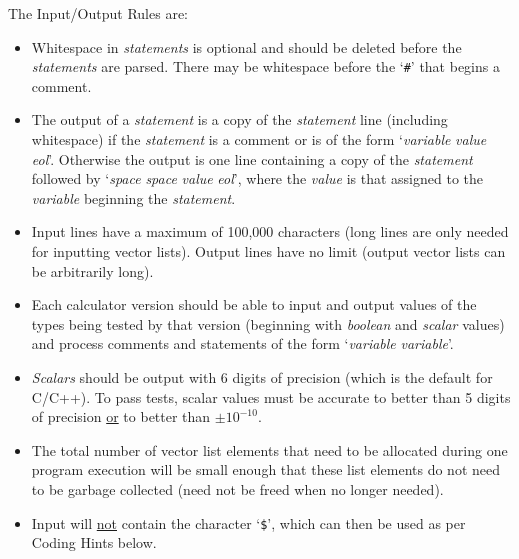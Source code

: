 \documentclass[12pt]{article}
\begin{document}
The Input/Output Rules are:
\begin{indpar}{0.2in}\begin{itemize}

\item Whitespace in {\em statements} is optional and should be deleted
before the {\em statements} are parsed.  There may be whitespace
before the `{\tt \#}' that begins a comment.

\item The output of a {\em statement} is a copy of the {\em statement}
line (including white\-space)
if the {\em statement} is a comment or is of the form
`{\em variable} \TT{=} {\em value} {\em eol}'.
Otherwise the output is one line containing a copy of the {\em statement}
followed by `{\em space} \TT{=} {\em space} {\em value} {\em eol}', where
the {\em value} is that assigned to the {\em variable} beginning the
{\em statement}.

\item Input lines have a maximum of 100,000 characters (long lines
are only needed for inputting vector lists).  Output lines have
no limit (output vector lists can be arbitrarily long).

\item Each calculator version should be able to input and output
values of the types being tested by that version (beginning with
{\em boolean} and {\em scalar} values) and process comments
and statements of the form `{\em variable} \TT{=} {\em variable}'.

\item {\em Scalars} should be output with 6 digits of precision
(which is the default for C/C++).  To pass tests, scalar values
must be accurate to better than 5 digits of precision \underline{or}
to better than $\pm 10^{-10}$.

\item  The total number of vector list elements that need to be
allocated during one program execution will be small enough
that these list elements do not need to be garbage collected
(need not be freed when no longer needed).

\item Input will \underline{not} contain the character `{\tt \$}',
which can then be used as per Coding Hints below.


\end{itemize}\end{indpar}

\newpage
\end{document}
